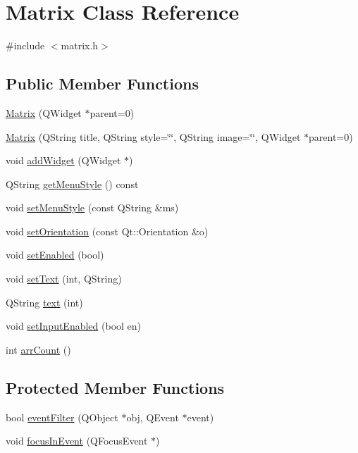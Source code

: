 \hypertarget{classMatrix}{
\section{Matrix Class Reference}
\label{classMatrix}
}


{\ttfamily \#include $<$matrix.h$>$}

\subsection*{Public Member Functions}
\begin{DoxyCompactItemize}
\item 
\hyperlink{classMatrix_a0c5753e6dece4a4824cb048c547582a4}{Matrix} (QWidget $\ast$parent=0)
\item 
\hyperlink{classMatrix_a6ebc45f87de9a49b3314fda941efb24f}{Matrix} (QString title, QString style=\char`\"{}\char`\"{}, QString image=\char`\"{}\char`\"{}, QWidget $\ast$parent=0)
\item 
void \hyperlink{classMatrix_a53fea58b6efc849c26c731f8178c18e0}{addWidget} (QWidget $\ast$)
\item 
QString \hyperlink{classMatrix_a529e80e4d3b32cad13888740aa2875de}{getMenuStyle} () const 
\item 
void \hyperlink{classMatrix_a1c6c865ef6fbfd4aca31cf84a39262d4}{setMenuStyle} (const QString \&ms)
\item 
void \hyperlink{classMatrix_a571e1aec866ba04b9e1f2fb12b114202}{setOrientation} (const Qt::Orientation \&o)
\item 
void \hyperlink{classMatrix_a3617fe2df4835ab4c9319e4d34a756c9}{setEnabled} (bool)
\item 
void \hyperlink{classMatrix_a5b1d9d8492cff710a9f0bdcbd465baca}{setText} (int, QString)
\item 
QString \hyperlink{classMatrix_a7285f98ef07a8e8d42b12172f4bbd287}{text} (int)
\item 
void \hyperlink{classMatrix_a89eb342828eb7a0ec3f4a827d21500ff}{setInputEnabled} (bool en)
\item 
int \hyperlink{classMatrix_ab8c6ce5374fbf2624503b194e854ff68}{arrCount} ()
\end{DoxyCompactItemize}
\subsection*{Protected Member Functions}
\begin{DoxyCompactItemize}
\item 
bool \hyperlink{classMatrix_ada7f0d8559fe1e7f45d3dc6a63bf3722}{eventFilter} (QObject $\ast$obj, QEvent $\ast$event)
\item 
void \hyperlink{classMatrix_a83400b2608b19f43246edaf3814f5710}{focusInEvent} (QFocusEvent $\ast$)
\end{DoxyCompactItemize}
